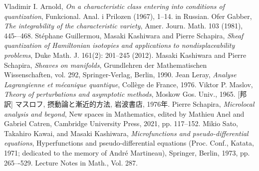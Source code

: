 \documentclass[11pt, letterpaper, draft, dvipdfmx]{book}
\theoremstyle{definition}
\theoremstyle{mystyle}
\numberwithin{equation}{section} %
\begin{document}
\begin{thebibliography}{15}
     Vladimir I. Arnold, 
    \textit{On a characteristic class entering into conditions of quantization}, 
    Funkcional. Anal. i Prilozen (1967), 1–14. in Russian.
    Ofer Gabber, \textit{The integrability of the characteristic variety}, 
    Amer. Journ. Math. 103 (1981), 445-–468.
    Stéphane Guillermou, Masaki Kashiwara and Pierre Schapira, 
    \textit{Sheaf quantization of Hamiltonian isotopies and applications to nondisplaceability problems}, 
    Duke Math. J. 161(2): 201--245 (2012).
     Masaki Kashiwara and Pierre Schapira, 
    \textit{Sheaves on manifolds}, Grundlehren der Mathematischen Wissenschaften, 
    vol. 292, Springer-Verlag, Berlin, 1990.
    Jean Leray, \textit{Analyse Lagrangienne et m\'ecanique quantique}, 
    Coll\`ege de France, 1976.
     Viktor P. Maslov, 
    \textit{Theory of perturbations and asymptotic methods}, 
    Moskow Gos. Univ., 1965.
    [邦訳] マスロフ, 摂動論と漸近的方法, 岩波書店, 1976年.
    Pierre Schapira, 
    \textit{Microlocal analysis and beyond}, 
    New spaces in Mathematics, edited by Mathieu Anel 
    and Gabriel Catren, 
    Cambridge University Press, 2021, pp. 117--152.
    Mikio Sato, Takahiro Kawai, and Masaki Kashiwara, 
    \textit{Microfunctions and pseudo-differential equations}, 
    Hyperfunctions and pseudo-differential equations 
    (Proc. Conf., Katata, 1971; dedicated to the memory of 
    Andr\'e Martineau), 
    Springer, Berlin, 1973, pp. 265–-529. 
    Lecture Notes in Math., Vol. 287.

\end{thebibliography}
%
%
\end{document}
